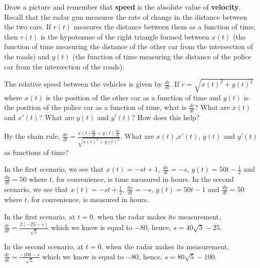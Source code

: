 \documentclass{ximera}
\begin{document}
\begin{exercise}
\begin{hint}
Draw a picture and remember that \textbf{speed} is the absolute value of \textbf{velocity}. Recall that the radar gun measures the rate of change in the distance between the two cars. If $r(t)$ measures the distance between them as a function of time, then $r(t)$ is the hypotenuse of the right triangle formed between $x(t)$ (the function of time measuring the distance of the other car from the intersection of the roads) and $y(t)$ (the function of time measuring the distance of the police car from the intersection of the roads). 
\end{hint}
\begin{hint}
The relative speed between the vehicles is given by $\frac{dr}{dt}$. If $r=\sqrt{x(t)^2+y(t)^2}$ where $x(t)$ is the position of the other car as a function of time and $y(t)$ is the position of the police car as a function of time, what is $\frac{dr}{dt}$? What are $x(t)$ and $x'(t)$? What are $y(t)$ and $y'(t)$? How does this help? 
\end{hint}
\begin{hint}
By the chain rule, $\frac{dr}{dt}=\frac{x(t)\frac{dx}{dt}+y(t)\frac{dy}{dt}}{\sqrt{x(t)^2+y(t)^2}}$. What are $x(t)$,$x'(t)$, $y(t)$ and $y'(t)$ as functions of time?
\end{hint}
\begin{hint}
In the first scenario, we see that $x(t)=-st+1$, $\frac{dx}{dt}=-s$, $y(t)=50t-\frac{1}{2}$ and $\frac{dy}{dt}=50$ where $t$, for convenience, is time measured in hours. In the second scenario, we see that $x(t)=-st+\frac{1}{2}$, $\frac{dx}{dt}=-s$, $y(t)=50t-1$ and $\frac{dy}{dt}=50$ where $t$, for convenience, is measured in hours.
\end{hint}
\begin{hint}
In the first scenario, at $t=0$, when the radar makes its measurement, $\frac{dr}{dt}=\frac{2(-25-s)}{\sqrt{5}}$ which we know is equal to $-80$, hence, $s=40\sqrt{5}-25$.

In the second scenario, at $t=0$, when the radar makes its measurement, $\frac{dr}{dt}=\frac{-100-s}{\sqrt{5}}$ which we know is equal to $-80$, hence, $s=80\sqrt{5}-100$.
\end{hint}
\end{exercise}
\end{document}
